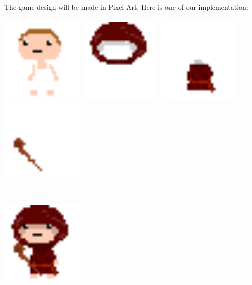 \documentclass[16pt, oneside]{report}
\begin{document}
The game design will be made in Pixel Art. Here is one of our implementation:
\\
\\
\includegraphics[width=0.3\textwidth]{character-base}
\includegraphics[width=0.3\textwidth]{character-head}
\includegraphics[width=0.3\textwidth]{character-robe}
\includegraphics[width=0.3\textwidth]{character-wand}
\\
\\
\\
\begin{center}
\includegraphics[width=0.3\textwidth]{character}
\end{center}
\end{document}

